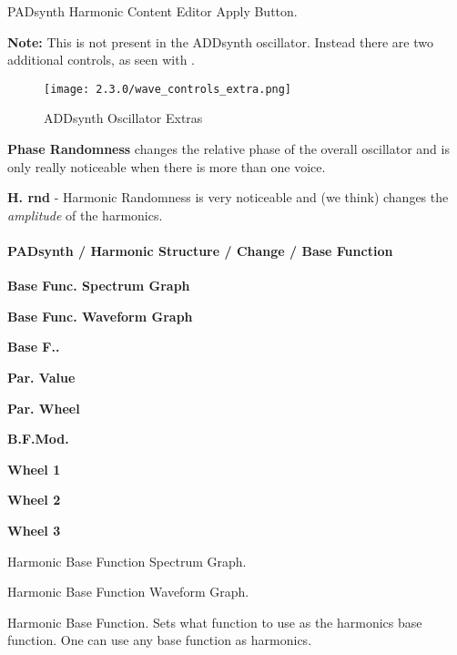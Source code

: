    PADsynth Harmonic Content Editor Apply Button.

   \textbf{Note:} This is not present in the ADDsynth oscillator. Instead there are two additional
   controls, as seen with
   .

\begin{figure}[H]
   \centering
   \texttt{[image: 2.3.0/wave\_controls\_extra.png]}
   \caption{ADDsynth Oscillator Extras}
   \label{fig:addsynth_wave_controls_extra}
\end{figure}
    \textbf{Phase Randomness} changes the relative phase of the overall oscillator and is only really
    noticeable when there is more than one voice.

    \textbf{H. rnd} - Harmonic Randomness is very noticeable and (we think) changes the
    \textsl{amplitude} of the harmonics.

\paragraph{PADsynth / Harmonic Structure / Change / Base Function}
\label{paragraph:padsynth_harmonic_structure_change_base_function}

   \begin{enumber}
      \item \textbf{Base Func. Spectrum Graph}
      \item \textbf{Base Func. Waveform Graph}
      \item \textbf{Base F..}
      \item \textbf{Par. Value}
      \item \textbf{Par. Wheel}
      \item \textbf{B.F.Mod.}
      \item \textbf{Wheel 1}
      \item \textbf{Wheel 2}
      \item \textbf{Wheel 3}
   \end{enumber}

   \setcounter{ItemCounter}{0}      %

   Harmonic Base Function Spectrum Graph.

   Harmonic Base Function Waveform Graph.

   Harmonic Base Function.
   Sets what function to use as the harmonics base function.
   One can use any base function as harmonics.

